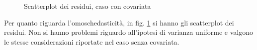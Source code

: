 \documentclass[a4paper,11pt,twoside,openright]{book}							%
\begin{document}
\begin{figure}[t]
	\centering
	\caption{Scatterplot dei residui, caso con covariata}
	\label{fig:DomCcovar_residui}
\end{figure}

Per quanto riguarda l'omoschedasticità, in fig. \ref{fig:DomCcovar_residui} si hanno gli scatterplot dei residui. Non si hanno problemi riguardo all'ipotesi di varianza uniforme e valgono le stesse considerazioni riportate nel caso senza covariata.
\end{document}
